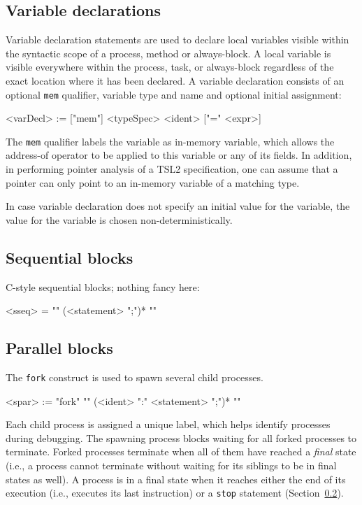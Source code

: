 \documentclass{report}
\newcommand{\src}[1]{\texttt{#1}}
\newcommand{\tsl}{TSL2 }
\begin{document}
\subsection{Variable declarations}\label{s:r:localvar}

Variable declaration statements are used to declare local 
variables visible within the syntactic scope of a process, method 
or always-block.  A local variable is visible everywhere within 
the process, task, or always-block regardless of the exact 
location where it has been declared.  A variable declaration 
consists of an optional \src{mem} qualifier, variable type and 
name and optional initial assignment:
\begin{bnflisting}{}
<varDecl> := ["mem"] <typeSpec> <ident> ["=" <expr>]
\end{bnflisting}
The \src{mem} qualifier labels the variable as in-memory variable,
which allows the address-of operator to be applied to this 
variable or any of its fields.  In addition, in performing pointer 
analysis of a \tsl specification, one can assume that a pointer 
can only point to an in-memory variable of a matching type.

In case variable declaration does not specify an initial value for 
the variable, the value for the variable is chosen 
non-deterministically.

\subsection{Sequential blocks} 

C-style sequential blocks; nothing fancy here:
\begin{bnflisting}{}
<sseq> = "{" (<statement> ";")* "}"
\end{bnflisting}

\subsection{Parallel blocks}\label{s:r:fork}

The \src{fork} construct is used to spawn several child processes.  
\begin{bnflisting}{}
<spar> := "fork" "{" 
               (<ident> ":" <statement> ";")*
          "}"
\end{bnflisting}
Each child process is assigned a unique label, which helps 
identify processes during debugging.  The spawning process blocks 
waiting for all forked processes to terminate.  Forked processes 
terminate when all of them have reached a \emph{final} state 
(i.e., a process cannot terminate without waiting for its siblings 
to be in final states as well).  A process is in a final state 
when it reaches either the end of its execution (i.e., executes 
its last instruction) or a \src{stop} statement (Section~\ref{}).  
\end{document}
